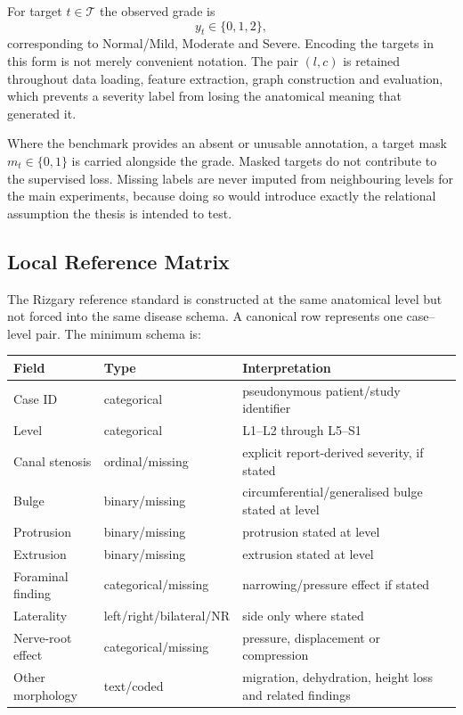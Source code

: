 For target $t\in\mathcal{T}$ the observed grade is
\[
y_t\in\{0,1,2\},
\]
corresponding to Normal/Mild, Moderate and Severe. Encoding the targets in this
form is not merely convenient notation. The pair $(l,c)$ is retained throughout
data loading, feature extraction, graph construction and evaluation, which
prevents a severity label from losing the anatomical meaning that generated it.

Where the benchmark provides an absent or unusable annotation, a target mask
$m_t\in\{0,1\}$ is carried alongside the grade. Masked targets do not contribute
to the supervised loss. Missing labels are never imputed from neighbouring
levels for the main experiments, because doing so would introduce exactly the
relational assumption the thesis is intended to test.

\subsection{Local Reference Matrix}
\label{sec:method-local-reference}

The Rizgary reference standard is constructed at the same anatomical level but
not forced into the same disease schema. A canonical row represents one
case--level pair. The minimum schema is:

\begin{center}
\begin{tabular}{p{2.4cm}p{2.0cm}p{8.1cm}}
\toprule
\textbf{Field} & \textbf{Type} & \textbf{Interpretation}\\
\midrule
Case ID & categorical & pseudonymous patient/study identifier\\
Level & categorical & L1--L2 through L5--S1\\
Canal stenosis & ordinal/missing & explicit report-derived severity, if stated\\
Bulge & binary/missing & circumferential/generalised bulge stated at level\\
Protrusion & binary/missing & protrusion stated at level\\
Extrusion & binary/missing & extrusion stated at level\\
Foraminal finding & categorical/missing & narrowing/pressure effect if stated\\
Laterality & left/right/bilateral/NR & side only where stated\\
Nerve-root effect & categorical/missing & pressure, displacement or compression\\
Other morphology & text/coded & migration, dehydration, height loss and related findings\\
\bottomrule
\end{tabular}
\end{center}

